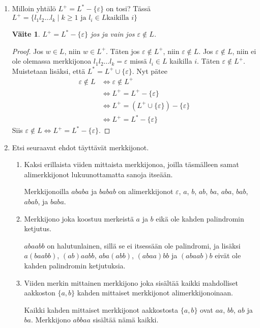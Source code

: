 \documentclass[a4paper,11pt,draft]{article}
\newtheorem*{claim}{Väite}
\begin{document}
\begin{enumerate}
\newpage
\item
  Milloin yhtälö $L^+ = L^* - \{\varepsilon\}$ on tosi? Tässä $L^+ =
  \{l_1l_2 \ldots l_k \mid k \ge 1 \text{ ja } l_i \in L \text{
    kaikilla } i\}$
  \begin{claim}
    $L^+ = L^* - \{\varepsilon\}$ jos ja vain jos $\varepsilon \notin L$.
  \end{claim}
  \begin{proof}
    Jos $w \in L$, niin $w \in L^+$. Täten jos $\varepsilon \notin
    L^+$, niin $\varepsilon \notin L$. Jos $\varepsilon \notin L$,
    niin ei ole olemassa merkkijonoa $l_1l_2 \ldots l_k =
    \varepsilon$ missä $l_i \in L$ kaikilla $i$. Täten $\varepsilon
    \notin L^+$. Muistetaan lisäksi, että $L^* = L^+ \cup
    \{\varepsilon\}$. Nyt pätee
    \begin{align*}
      \varepsilon \notin L &\Leftrightarrow \varepsilon \notin L^+ \\
      &\Leftrightarrow L^+ = L^+ - \{\varepsilon\} \\
      &\Leftrightarrow L^+ = (L^+ \cup \{\varepsilon\}) -
      \{\varepsilon\} \\
      &\Leftrightarrow L^+ = L^* - \{\varepsilon\}
    \end{align*}
    Siis $\varepsilon \notin L \Leftrightarrow L^+ = L^* - \{\varepsilon\}$.
  \end{proof}

\item
  Etsi seuraavat ehdot täyttävät merkkijonot.
  \begin{enumerate}
  \item Kaksi erillaista viiden mittaista merkkijonoa, joilla
    täsmälleen samat alimerkkijonot lukuunottamatta sanoja itseään.

    Merkkijonoilla $ababa$ ja $babab$ on alimerkkijonot
    $\varepsilon$, $a$, $b$, $ab$, $ba$, $aba$, $bab$, $abab$, ja
    $baba$.
  \item Merkkijono joka koostuu merkeistä $a$ ja $b$ eikä ole kahden
    palindromin ketjutus.

    $abaabb$ on halutunlainen, sillä se ei itsessään ole palindromi,
    ja lisäksi $a(baabb)$, $(ab)aabb$, $aba(abb)$, $(abaa)bb$ ja
    $(abaab)b$ eivät ole kahden palindromin ketjutuksia.
  \item Viiden merkin mittainen merkkijono joka sisältää kaikki
    mahdolliset aakkoston $\{a,b\}$ kahden mittaiset merkkijonot
    alimerkkijonoinaan.

    Kaikki kahden mittaiset merkkijonot aakkostosta $\{a,b\}$ ovat
    $aa$, $bb$, $ab$ ja $ba$. Merkkijono $abbaa$ sisältää nämä
    kaikki.
  \end{enumerate}

\end{enumerate}
\end{document}
